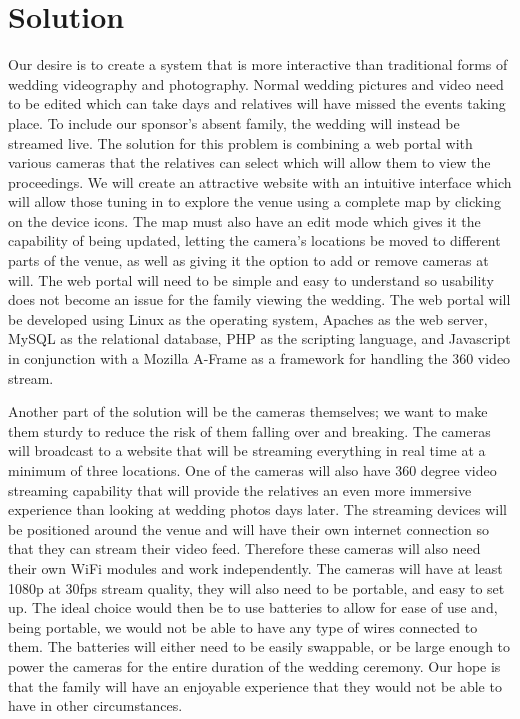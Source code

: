 \documentclass[onecolumn, draftclsnofoot,10pt, compsoc]{IEEEtran}
\begin{document}
\section{Solution}
Our desire is to create a system that is more interactive than traditional forms of wedding videography and photography.
Normal wedding pictures and video need to be edited which can take days and relatives will have missed the events taking place.
To include our sponsor's absent family, the wedding will instead be streamed live. 
The solution for this problem is combining a web portal with various cameras that the relatives can select which will allow them to view the proceedings.
We will create an attractive website with an intuitive interface which will allow those tuning in to explore the venue using a complete map by clicking on the device icons. 
The map must also have an edit mode which gives it the capability of being updated, letting the camera's locations be moved to different parts of the venue, as well as giving it the option to add or remove cameras at will.
The web portal will need to be simple and easy to understand so usability does not become an issue for the family viewing the wedding.
The web portal will be developed using Linux as the operating system, Apaches as the web server, MySQL as the relational database, PHP as the scripting language, and Javascript in conjunction with a Mozilla A-Frame as a framework for handling the 360 video stream. 
\newline
\newline

Another part of the solution will be the cameras themselves; we want to make them sturdy to reduce the risk of them falling over and breaking. 
The cameras will broadcast to a website that will be streaming everything in real time at a minimum of three locations. 
One of the cameras will also have 360 degree video streaming capability that will provide the relatives an even more immersive experience than looking at wedding photos days later.  
The streaming devices will be positioned around the venue and will have their own internet connection so that they can stream their video feed.
Therefore these cameras will also need their own WiFi modules and work independently.
The cameras will have at least 1080p at 30fps stream quality, they will also need to be portable, and easy to set up.
The ideal choice would then be to use batteries to allow for ease of use and, being portable, we would not be able to have any type of wires connected to them.
The batteries will either need to be easily swappable, or be large enough to power the cameras for the entire duration of the wedding ceremony.
Our hope is that the family will have an enjoyable experience that they would not be able to have in other circumstances.
\end{document}
